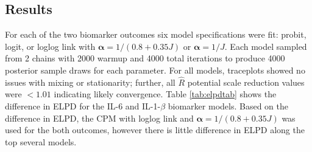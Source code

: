 \documentclass[
]{article}
\begin{document}
\hypertarget{results-1}{%
\subsection{Results}\label{results-1}}

For each of the two biomarker outcomes six model specifications were fit: probit, logit, or loglog link with \(\boldsymbol{\alpha}=1/(0.8+0.35J)\) or \(\boldsymbol{\alpha}=1/J\). Each model sampled from 2 chains with 2000 warmup and 4000 total iterations to produce 4000 posterior sample draws for each parameter. For all models, traceplots showed no issues with mixing or stationarity; further, all \(\hat{R}\) potential scale reduction values were \(<1.01\) indicating likely convergence. Table \ref{tab:elpdtab} shows the difference in ELPD for the IL-6 and IL-1-\(\beta\) biomarker models. Based on the difference in ELPD, the CPM with loglog link and \(\boldsymbol{\alpha}=1/(0.8+0.35J)\) was used for the both outcomes, however there is little difference in ELPD along the top several models.
\end{document}
